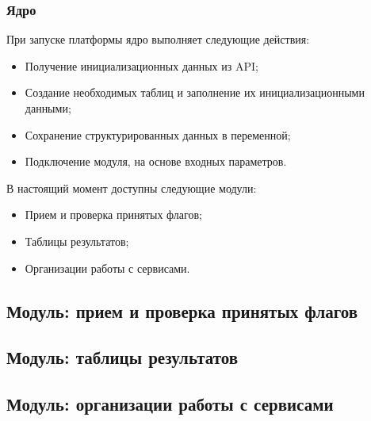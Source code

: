 \subsubsection{Ядро}

При запуске платформы ядро выполняет следующие действия:
\begin{itemize} 
\item Получение инициализационных данных из API;
\item Создание необходимых таблиц и заполнение их инициализационными данными; 
\item Сохранение структурированных данных в переменной;
\item Подключение модуля, на основе входных параметров.
\end{itemize}

В настоящий момент доступны следующие модули:
\begin{itemize} 
\item Прием и проверка принятых флагов;
\item Таблицы результатов; 
\item Организации работы с сервисами.
\end{itemize}


\subsection{Модуль: прием и проверка принятых флагов} %


\subsection{Модуль: таблицы результатов} %


\subsection{Модуль: организации работы с сервисами} %


\clearpage